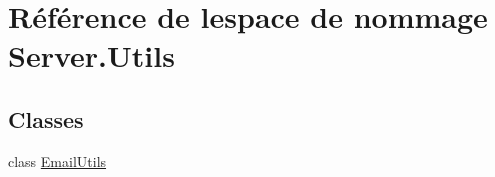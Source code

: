 \hypertarget{namespace_server_1_1_utils}{}\section{Référence de l\textquotesingle{}espace de nommage Server.\+Utils}
\label{namespace_server_1_1_utils}
\subsection*{Classes}
\begin{DoxyCompactItemize}
\item 
class \hyperlink{class_server_1_1_utils_1_1_email_utils}{Email\+Utils}
\end{DoxyCompactItemize}
